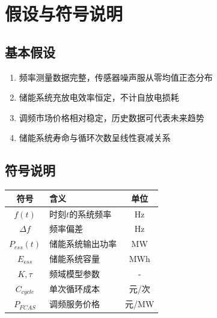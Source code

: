 \newpage
\section{假设与符号说明}

\subsection{基本假设}
\begin{enumerate}
    \item 频率测量数据完整，传感器噪声服从零均值正态分布
    \item 储能系统充放电效率恒定，不计自放电损耗
    \item 调频市场价格相对稳定，历史数据可代表未来趋势
    \item 储能系统寿命与循环次数呈线性衰减关系
\end{enumerate}

\subsection{符号说明}
\begin{center}
\begin{tabular}{c l c}
\hline
符号 & 含义 & 单位 \\
\hline
$f(t)$ & 时刻$t$的系统频率 & Hz \\
$\Delta f$ & 频率偏差 & Hz \\
$P_{ess}(t)$ & 储能系统输出功率 & MW \\
$E_{ess}$ & 储能系统容量 & MWh \\
$K, \tau$ & 频域模型参数 & - \\
$C_{cycle}$ & 单次循环成本 & 元/次 \\
$P_{FCAS}$ & 调频服务价格 & 元/MW\\
\hline
\end{tabular}
\end{center}
